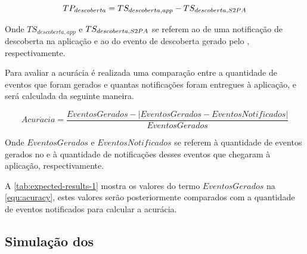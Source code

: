 \begin{equation}
	\label{equ:performance-discovery}
	TP_{descoberta} = TS_{descoberta,app} - TS_{descoberta,S2PA{}}
\end{equation}

Onde $TS_{descoberta,app}$ e $TS_{descoberta,S2PA{}}$ se referem ao \timestamp{} de uma notificação de descoberta na aplicação e ao \timestamp{} do evento de descoberta gerado pelo \stwopa{}, respectivamente.

Para avaliar a acurácia é realizada uma comparação entre a quantidade de eventos que foram gerados e quantas notificações foram entregues à aplicação, e será calculada da seguinte maneira.

\begin{equation}
	\label{equ:acuracy}
	Acur\acute{a}cia = \frac{EventosGerados - |EventosGerados - EventosNotificados|}{EventosGerados}
\end{equation}

Onde $EventosGerados$ e $EventosNotificados$ se referem à quantidade de eventos gerados no \stwopa{} e à quantidade de notificações desses eventos que chegaram à aplicação, respectivamente.

A \autoref{tab:expected-results-1} mostra os valores do termo $EventosGerados$ na \autoref{equ:acuracy}, estes valores serão posteriormente comparados com a quantidade de eventos notificados para calcular a acurácia.

\begin{table}[htb]
	\begin{center}
	\end{center}
\end{table}

\subsection{Simulação dos \beacons{}}\label{chap:avaliacao-simulacao-beacons}


